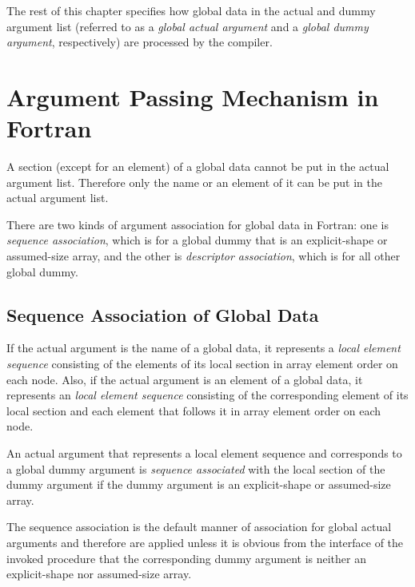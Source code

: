 \hspace{-1.2\parindent}
The rest of this chapter specifies how global data in the actual and
dummy argument list (referred to as a {\it global actual argument} and a
{\it global dummy argument}, respectively) are processed by the {\XMP}
compiler.


\section{Argument Passing Mechanism in {\XMP} Fortran}

A section (except for an element) of a global data cannot be put in the
actual argument list. Therefore only the name or an element of it can be
put in the actual argument list.

There are two kinds of argument association for global data in {\XMP}
Fortran: one is {\it sequence association}, which is for a global dummy
that is an explicit-shape or assumed-size array, and the other is
{\it descriptor association}, which is for all other global dummy.


\subsection{Sequence Association of Global Data}

If the actual argument is the name of a global data, it represents a
{\it local element sequence} consisting of the elements of its local
section in array element order on each node.
%
Also, if the actual argument is an element of a global data, it
represents an {\it local element sequence} consisting of the
corresponding element of its local section and each element that follows
it in array element order on each node.

An actual argument that represents a local element sequence and
corresponds to a global dummy argument is {\it sequence associated} with
the local section of the dummy argument if the dummy argument is an
explicit-shape or assumed-size array.

The sequence association is the default manner of association for global
actual arguments and therefore are applied unless it is obvious from the
interface of the invoked procedure that the corresponding dummy argument
is neither an explicit-shape nor assumed-size array.


